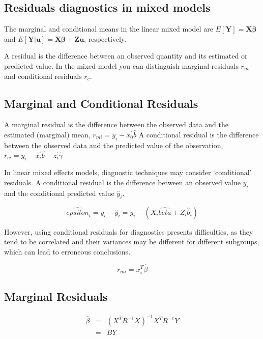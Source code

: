 \documentclass[Chap5amain.tex]{subfiles}
\begin{document}

\subsection{Residuals diagnostics in mixed models}

The marginal and conditional means in the linear mixed model are
$E[\boldsymbol{Y}] = \boldsymbol{X}\boldsymbol{\beta}$ and
$E[\boldsymbol{Y|\boldsymbol{u}}] = \boldsymbol{X}\boldsymbol{\beta} + \boldsymbol{Z}\boldsymbol{u}$, respectively.

A residual is the difference between an observed quantity and its estimated or predicted value. In the mixed
model you can distinguish marginal residuals $r_m$ and conditional residuals $r_c$. 


\subsection{Marginal and Conditional Residuals}

A marginal residual is the difference between the observed data and the estimated (marginal) mean, $r_{mi} = y_i - x_0^{\prime} \hat{b}$
A conditional residual is the difference between the observed data and the predicted value of the observation,
$r_{ci} = y_i - x_i^{\prime} \hat{b} - z_i^{\prime} \hat{\gamma}$

In linear mixed effects models, diagnostic techniques may consider `conditional' residuals. A conditional residual is the difference between an observed value $y_{i}$ and the conditional predicted value $\hat{y}_{i} $.

\[ \hat{epsilon}_{i} = y_{i} - \hat{y}_{i} = y_{i} - ( X_{i}\hat{beta} + Z_{i}\hat{b}_{i}) \]

However, using conditional residuals for diagnostics presents difficulties, as they tend to be correlated and their variances may be different for different subgroups, which can lead to erroneous conclusions.







\begin{equation}
	r_{mi}=x^{T}_{i}\hat{\beta}
\end{equation}

\subsection{Marginal Residuals}
\begin{eqnarray}
	\hat{\beta} &=& (X^{T}R^{-1}X)^{-1}X^{T}R^{-1}Y \nonumber \\
	&=& BY \nonumber
\end{eqnarray}
\end{document}
